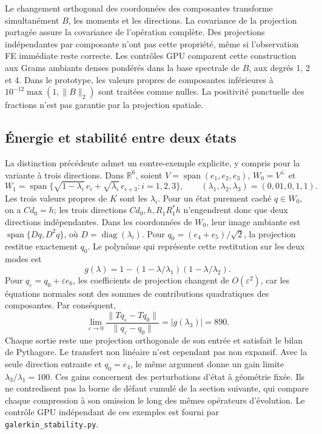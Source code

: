 \documentclass[11pt,a4paper]{article}
\begin{document}
Le changement orthogonal des coordonnées des composantes transforme
simultanément $B$, les moments et les directions. La covariance de la
projection partagée assure la covariance de l'opération complète.
Des projections indépendantes par composante n'ont pas cette propriété,
même si l'observation FE immédiate reste correcte. Les contrôles GPU
comparent cette construction aux Grams ambiants denses pondérés dans
la base spectrale de $B$, aux degrés 1, 2 et 4. Dans le prototype,
les valeurs propres de composantes inférieures à
$10^{-12}\max(1,\|B\|_2)$ sont traitées comme nulles. La positivité
ponctuelle des fractions n'est pas garantie par la projection spatiale.

\subsection{Énergie et stabilité entre deux états}
La distinction précédente admet un contre-exemple explicite, y compris
pour la variante à trois directions. Dans $\mathbb R^6$, soient
$V=\operatorname{span}(e_1,e_2,e_3)$,
$W_0=V^\perp$ et
\[
 W_1=\operatorname{span}\{\sqrt{1-\lambda_i}\,e_i
              +\sqrt{\lambda_i}\,e_{i+3}:i=1,2,3\},
 \qquad (\lambda_1,\lambda_2,\lambda_3)=(0{,}01,0{,}1,1).
\]
Les trois valeurs propres de $K$ sont les $\lambda_i$. Pour un état
purement caché $q\in W_0$, on a $Cd_0=h$; les trois directions
$Cd_0,h,R_1R_1^*h$ n'engendrent donc que deux directions indépendantes.
Dans les coordonnées de $W_0$, leur image ambiante est
$\operatorname{span}\{Dq,D^2q\}$, où $D=\operatorname{diag}(\lambda_i)$.
Pour $q_0=(e_4+e_5)/\sqrt2$, la projection restitue exactement $q_0$.
Le polynôme qui représente cette restitution sur les deux modes est
\[
 g(\lambda)=1-(1-\lambda/\lambda_1)(1-\lambda/\lambda_2).
\]
Pour $q_\varepsilon=q_0+\varepsilon e_6$, les coefficients de projection
changent de $O(\varepsilon^2)$, car les équations normales sont des
sommes de contributions quadratiques des composantes. Par conséquent,
\[
 \lim_{\varepsilon\to0}
 \frac{\|Tq_\varepsilon-Tq_0\|}{\|q_\varepsilon-q_0\|}
 =|g(\lambda_3)|=890.
\]
Chaque sortie reste une projection orthogonale de son entrée et satisfait
le bilan de Pythagore. Le transfert non linéaire n'est cependant pas
non expansif. Avec la seule direction entrante et $q_0=e_4$, le même
argument donne un gain limite $\lambda_3/\lambda_1=100$.
Ces gains concernent des perturbations d'état à géométrie fixée.
Ils ne contredisent pas la borne de défaut cumulé de la section suivante,
qui compare chaque compression à son omission le long des mêmes
opérateurs d'évolution. Le contrôle GPU indépendant de ces exemples
est fourni par \texttt{galerkin\_stability.py}.
\end{document}
